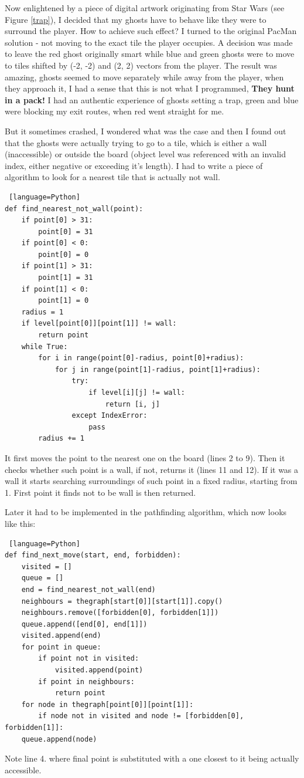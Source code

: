\documentclass[11pt,a4paper]{report}
\begin{document}
					Now enlightened by a piece of digital artwork originating from Star Wars (see Figure \ref{trap}), I decided that my ghosts have to behave like they were to surround the player. How to achieve such effect? I turned to the original PacMan solution - not moving to the exact tile the player occupies. A decision was made to leave the red ghost originally smart while blue and green ghosts were to move to tiles shifted by (-2, -2) and (2, 2) vectors from the player. The result was amazing, ghosts seemed to move separately while away from the player, when they approach it, I had a sense that this is not what I programmed, \textbf{They hunt in a pack!} I had an authentic experience of ghosts setting a trap, green and blue were blocking my exit routes, when red went straight for me.
					
					But it sometimes crashed, I wondered what was the case and then I found out that the ghosts were actually trying to go to a tile, which is either a wall (inaccessible) or outside the board (object level was referenced with an invalid index, either negative or exceeding it's length). I had to write a piece of algorithm to look for a nearest tile that is actually not wall.
					
					\begin{lstlisting} [language=Python]
def find_nearest_not_wall(point):
    if point[0] > 31:
        point[0] = 31
    if point[0] < 0:
        point[0] = 0
    if point[1] > 31:
        point[1] = 31
    if point[1] < 0:
        point[1] = 0
    radius = 1
    if level[point[0]][point[1]] != wall:
        return point
    while True:
        for i in range(point[0]-radius, point[0]+radius):
            for j in range(point[1]-radius, point[1]+radius):
                try:
                    if level[i][j] != wall:
                        return [i, j]
                except IndexError:
                    pass
        radius += 1
					\end{lstlisting}
					It first moves the point to the nearest one on the board (lines 2 to 9). Then it checks whether such point is a wall, if not, returns it (lines 11 and 12). If it was a wall it starts searching surroundings of such point in a fixed radius, starting from 1. First point it finds not to be wall is then returned.
					
					Later it had to be implemented in the pathfinding algorithm, which now looks like this:
					\begin{lstlisting} [language=Python]
def find_next_move(start, end, forbidden):
    visited = []
    queue = []
    end = find_nearest_not_wall(end)
    neighbours = thegraph[start[0]][start[1]].copy()
    neighbours.remove([forbidden[0], forbidden[1]])
    queue.append([end[0], end[1]])
    visited.append(end)
    for point in queue:
        if point not in visited:
            visited.append(point)
        if point in neighbours:
            return point
    for node in thegraph[point[0]][point[1]]:
        if node not in visited and node != [forbidden[0], forbidden[1]]:
    queue.append(node)
					\end{lstlisting}
					Note line 4. where final point is substituted with a one closest to it being actually accessible.
					
\end{document}

